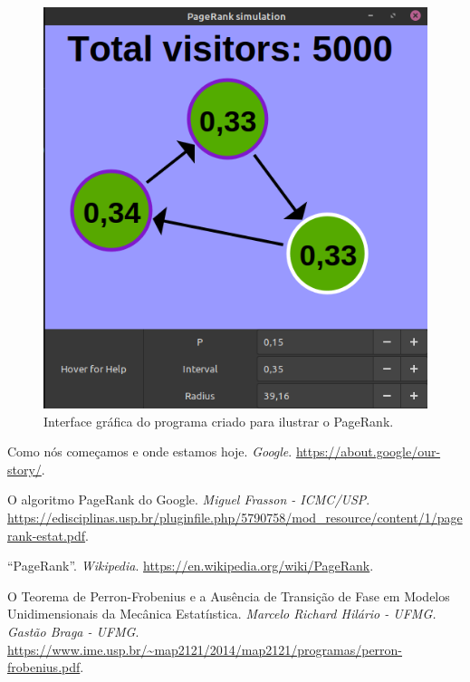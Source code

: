 \documentclass{article}
\begin{document}
\begin{figure}[H]
    \centering
    \includegraphics[scale = 0.35]{pagerank_demo.png}
    \caption{Interface gráfica do programa criado para ilustrar o PageRank.}
    \label{simulacao}
\end{figure}

\newpage
\begin{thebibliography}{9}

 Como nós começamos e onde estamos hoje. \textit{Google}. \url{https://about.google/our-story/}.

 O algoritmo PageRank do Google. \textit{Miguel Frasson - ICMC/USP}. \url{https://edisciplinas.usp.br/pluginfile.php/5790758/mod_resource/content/1/pagerank-estat.pdf}.

 ``PageRank''. \textit{Wikipedia}. \url{https://en.wikipedia.org/wiki/PageRank}.

 O Teorema de Perron-Frobenius e a Ausência de Transição de Fase em Modelos Unidimensionais da Mecânica Estatíıstica. \textit{Marcelo Richard Hilário - UFMG. Gastão Braga - UFMG}. \url{https://www.ime.usp.br/~map2121/2014/map2121/programas/perron-frobenius.pdf}.

\end{thebibliography}
\end{document}
